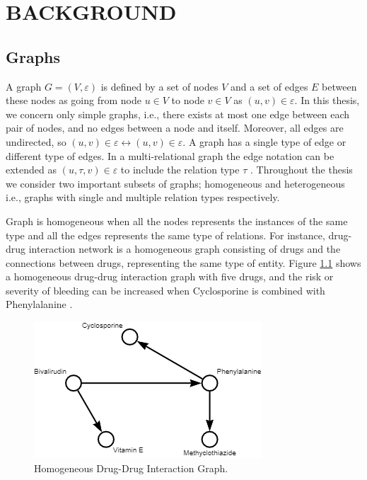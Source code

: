 \chapter{BACKGROUND}
\label{background}

\section{Graphs}
A graph $G = (V, \varepsilon)$ is defined by a set of nodes $V$ and a set of edges $E$ between these nodes as going from node $u \in V$ to node $v \in V$ as $(u,v) \in \varepsilon$. In this thesis, we concern only simple graphs, i.e., there exists at most one edge between each pair of nodes, and no edges between  a node and itself. Moreover, all edges are undirected, so $(u,v) \in \varepsilon \longleftrightarrow (u,v) \in \varepsilon$. A graph has a single type of edge or different type of edges. In a multi-relational graph the edge notation can be extended as $(u,\tau,v) \in \varepsilon$ to include the relation type $\tau$ \cite{hamilton2020graph}. Throughout the thesis we consider two important subsets of graphs; homogeneous and heterogeneous i.e., graphs with single and multiple relation types respectively. 

Graph is homogeneous when all the nodes represents the instances of the same type and all the edges represents the same type of relations. For instance, drug-drug interaction network is a homogeneous graph consisting of drugs and the connections between drugs, representing the same type of entity. Figure \ref{fig:sample_ddi} shows a homogeneous drug-drug interaction graph with five drugs, and the risk or severity of bleeding can be increased when Cyclosporine is combined with Phenylalanine \cite{ihlefeldt2014polymorphs}. 

\begin{figure}
    \centering
        \includegraphics[width=0.5\linewidth]{chapters/background/figures/ddi.png} 
    \caption{Homogeneous Drug-Drug Interaction Graph.}
    \label{fig:sample_ddi}
\end{figure}

